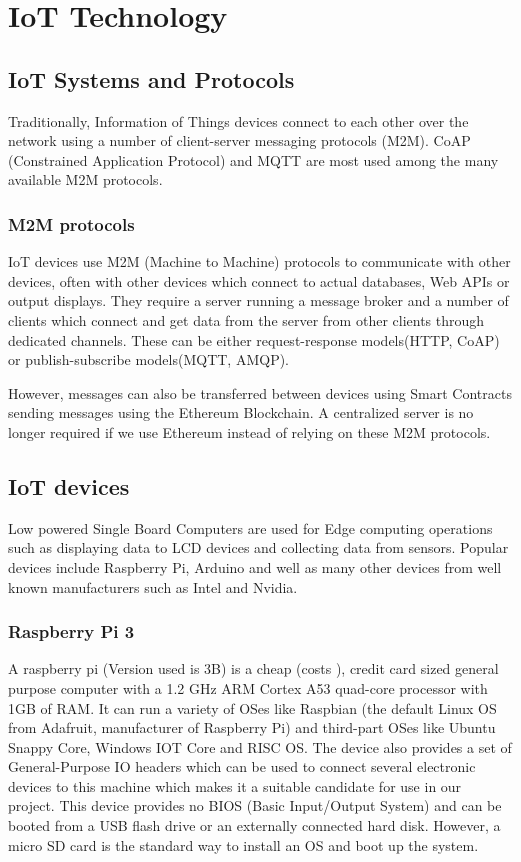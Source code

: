 \documentclass[11pt,openright]{report}
\begin{document}
\chapter{IoT Technology}
\label{chapter:iot_tech}
\section{IoT Systems and Protocols}
Traditionally, Information of Things devices connect to each other over the network using a number of client-server messaging protocols (M2M). CoAP (Constrained Application Protocol) and MQTT are most used among the many available M2M protocols.

\subsection{M2M protocols}
IoT devices use M2M (Machine to Machine) protocols to communicate with other devices, often with other devices which connect to actual databases, Web APIs or output displays. They require a server running a message broker and a number of clients which connect and get data from the server from other clients through dedicated channels. These can be either request-response models(HTTP, CoAP) or publish-subscribe models(MQTT, AMQP).

However, messages can also be transferred between devices using Smart Contracts sending messages using the Ethereum Blockchain. A centralized server is no longer required if we use Ethereum instead of relying on these M2M protocols.

\section{IoT devices}
Low powered Single Board Computers are used for Edge computing operations such as displaying data to LCD devices and collecting data from sensors. Popular devices include Raspberry Pi, Arduino and well as many other devices from well known manufacturers such as Intel and Nvidia.

\subsection{Raspberry Pi 3}
A raspberry pi (Version used is 3B) is a cheap (costs ), credit card sized general purpose computer with a 1.2 GHz ARM Cortex A53 quad-core processor with 1GB of RAM. It can run a variety of OSes like Raspbian (the default Linux OS from Adafruit, manufacturer of Raspberry Pi) and third-part OSes like Ubuntu Snappy Core, Windows IOT Core and RISC OS. The device also provides a set of General-Purpose IO headers which can be used to connect several electronic devices to this machine which makes it a suitable candidate for use in our project. This device provides no BIOS (Basic Input/Output System) and can be booted from a USB flash drive or an externally connected hard disk. However, a micro SD card is the standard way to install an OS and boot up the system.  
\end{document}
